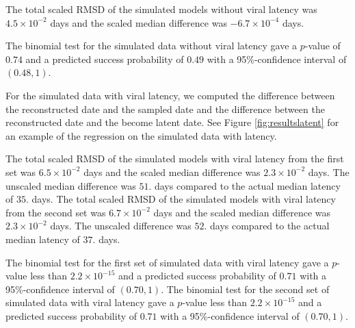 \documentclass[12pt]{article}
\begin{document}
The total scaled RMSD of the simulated models without viral latency was $4.5 \times 10^{-2}$ days and the scaled median difference was $-6.7 \times 10^{-4}$ days.

The binomial test for the simulated data without viral latency gave a $p$-value of $0.74$ and a predicted success probability of $0.49$ with a 95\%-confidence interval of $(0.48, 1)$.


For the simulated data with viral latency, we computed the difference between the reconstructed date and the sampled date and the difference between the reconstructed date and the become latent date.
See Figure \ref{fig:resultslatent} for an example of the regression on the simulated data with latency.

The total scaled RMSD of the simulated models with viral latency from the first set was $6.5 \times 10^{-2}$ days and the scaled median difference was $2.3 \times 10^{-2}$ days. The unscaled median difference was $51.$ days compared to the actual median latency of $35.$ days.
The total scaled RMSD of the simulated models with viral latency from the second set was $6.7 \times 10^{-2}$ days and the scaled median difference was $2.3 \times 10^{-2}$ days. The unscaled difference was $52.$ days compared to the actual median latency of $37.$ days.

The binomial test for the first set of simulated data with viral latency gave a $p$-value less than $2.2\times 10^{-15}$ and a predicted success probability of $0.71$ with a 95\%-confidence interval of $(0.70, 1)$.
The binomial test for the second set of simulated data with viral latency gave a $p$-value less than $2.2\times 10^{-15}$ and a predicted success probability of $0.71$ with a 95\%-confidence interval of $(0.70, 1)$.
\end{document}
